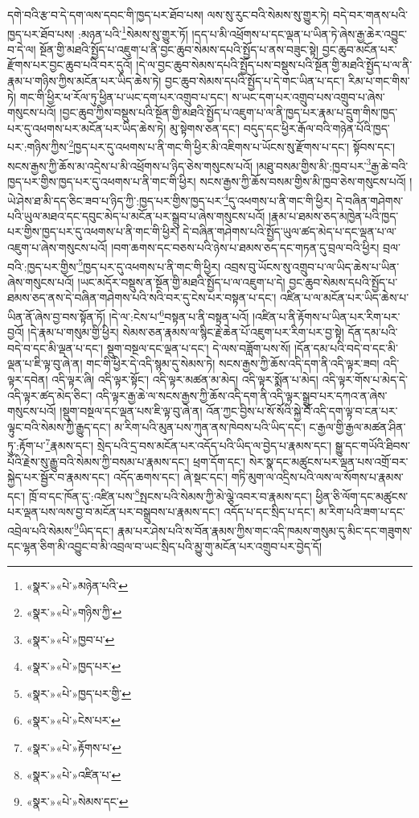 དགེ་བའི་རྩ་བ་དེ་དག་ལས་དབང་གི་ཁྱད་པར་ཐོབ་པས། ལས་སུ་རུང་བའི་སེམས་སུ་གྱུར་ཏེ། བདེ་བར་གནས་པའི་ཁྱད་པར་ཐོབ་པས། :མཉན་པའི་\footnote{«སྣར་»«པེ་»མཉེན་པའི་}སེམས་སུ་གྱུར་ཏོ། །དད་པ་མི་འཕྲོགས་པ་དང་ལྡན་པ་ཡིན་ཏེ་ཞེས་རྒྱ་ཆེར་འབྱུང་བ་དེ་ལ། སྔོན་གྱི་མཐའི་སྤྱོད་པ་འཇུག་པ་ནི་བྱང་ཆུབ་སེམས་དཔའི་སྤྱོད་པ་ནས་བཟུང་སྟེ། བྱང་ཆུབ་མངོན་པར་རྫོགས་པར་བྱང་ཆུབ་པའི་བར་དུའོ། །དེ་ལ་བྱང་ཆུབ་སེམས་དཔའི་སྤྱོད་པས་བསྡུས་པའི་སྔོན་གྱི་མཐའི་སྤྱོད་པ་ལ་ནི་རྣམ་པ་གཉིས་ཀྱིས་མངོན་པར་ཡིད་ཆེས་ཏེ། བྱང་ཆུབ་སེམས་དཔའི་སྤྱོད་པ་དེ་གང་ཡིན་པ་དང་། རིམ་པ་གང་གིས་ཏེ། གང་གི་ཕྱིར་ཕ་རོལ་ཏུ་ཕྱིན་པ་ཡང་དག་པར་འགྲུབ་པ་དང་། ས་ཡང་དག་པར་འགྲུབ་པས་འགྲུབ་པ་ཞེས་གསུངས་པའོ། །བྱང་ཆུབ་ཀྱིས་བསྡུས་པའི་སྔོན་གྱི་མཐའི་སྤྱོད་པ་འཇུག་པ་ལ་ནི་ཁྱད་པར་རྣམ་པ་དྲུག་གིས་ཁྱད་པར་དུ་འཕགས་པར་མངོན་པར་ཡིད་ཆེས་ཏེ། མུ་སྟེགས་ཅན་དང་། བདུད་དང་ཕྱིར་རྒོལ་བའི་གཉེན་པོའི་ཁྱད་པར་:གཉིས་ཀྱིས་\footnote{«སྣར་»«པེ་»གཉིས་ཀྱི་}ཁྱད་པར་དུ་འཕགས་པ་ནི་གང་གི་ཕྱིར་མི་འཇིགས་པ་ཡོངས་སུ་རྫོགས་པ་དང་། སྟོབས་དང་། སངས་རྒྱས་ཀྱི་ཆོས་མ་འདྲེས་པ་མི་འཕྲོགས་པ་ཉིད་ཅེས་གསུངས་པའོ། །མཐུ་བསམ་གྱིས་མི་:ཁྱབ་པར་\footnote{«སྣར་»«པེ་»ཁྱབ་པ་}རྒྱ་ཆེ་བའི་ཁྱད་པར་གྱིས་ཁྱད་པར་དུ་འཕགས་པ་ནི་གང་གི་ཕྱིར། སངས་རྒྱས་ཀྱི་ཆོས་བསམ་གྱིས་མི་ཁྱབ་ཅེས་གསུངས་པའོ། །ཡེ་ཤེས་ཐ་མི་དད་ཅིང་ཟབ་པ་ཉིད་ཀྱི་:ཁྱད་པར་གྱིས་ཁྱད་པར་\footnote{«སྣར་»«པེ་»ཁྱད་པར་}དུ་འཕགས་པ་ནི་གང་གི་ཕྱིར། དེ་བཞིན་གཤེགས་པའི་ཡུལ་མཐའ་དང་དབུང་མེད་པ་མངོན་པར་སྒྲུབ་པ་ཞེས་གསུངས་པའོ། །རྣམ་པ་ཐམས་ཅད་མཁྱེན་པའི་ཁྱད་པར་གྱིས་ཁྱད་པར་དུ་འཕགས་པ་ནི་གང་གི་ཕྱིར། དེ་བཞིན་གཤེགས་པའི་སྤྱོད་ཡུལ་ཚད་མེད་པ་དང་ལྡན་པ་ལ་འཇུག་པ་ཞེས་གསུངས་པའོ། །བག་ཆགས་དང་བཅས་པའི་ཉེས་པ་ཐམས་ཅད་དང་གཏན་དུ་བྲལ་བའི་ཕྱིར། བྲལ་བའི་:ཁྱད་པར་གྱིས་\footnote{«སྣར་»«པེ་»ཁྱད་པར་གྱི་}ཁྱད་པར་དུ་འཕགས་པ་ནི་གང་གི་ཕྱིར། འབྲས་བུ་ཡོངས་སུ་འགྲུབ་པ་ལ་ཡིད་ཆེས་པ་ཡིན་ཞེས་གསུངས་པའོ། །ཡང་མདོར་བསྡུས་ན་སྔོན་གྱི་མཐའི་སྤྱོད་པ་ལ་འཇུག་པ་དེ། བྱང་ཆུབ་སེམས་དཔའི་སྤྱོད་པ་ཐམས་ཅད་ནས་དེ་བཞིན་གཤེགས་པའི་སའི་བར་དུ་ངེས་པར་བསྟན་པ་དང་། འཛིན་པ་ལ་མངོན་པར་ཡིད་ཆེས་པ་ཡིན་ནོ་ཞེས་བྱ་བས་སྟོན་ཏོ། །དེ་ལ་:ངེས་པ་\footnote{«སྣར་»«པེ་»ངེས་པར་}བསྟན་པ་ནི་བསྟན་པའོ། །འཛིན་པ་ནི་རྟོགས་པ་ཡིན་པར་རིག་པར་བྱའོ། །དེ་རྣམ་པ་གསུམ་གྱི་ཕྱིར། སེམས་ཅན་རྣམས་ལ་སྙིང་རྗེ་ཆེན་པོ་འཇུག་པར་རིག་པར་བྱ་སྟེ། དོན་དམ་པའི་བདེ་བ་དང་མི་ལྡན་པ་དང་། སྡུག་བསྔལ་དང་ལྡན་པ་དང་། དེ་ལས་བཟློག་པས་སོ། །དོན་དམ་པའི་བདེ་བ་དང་མི་ལྡན་པ་ཇི་ལྟ་བུ་ཞེ་ན། གང་གི་ཕྱིར་དེ་འདི་སྙམ་དུ་སེམས་ཏེ། སངས་རྒྱས་ཀྱི་ཆོས་འདི་དག་ནི་འདི་ལྟར་ཟབ། འདི་ལྟར་དབེན། འདི་ལྟར་ཞི། འདི་ལྟར་སྟོང་། འདི་ལྟར་མཚན་མ་མེད། འདི་ལྟར་སྨོན་པ་མེད། འདི་ལྟར་གོས་པ་མེད་དེ་འདི་ལྟར་ཚད་མེད་ཅིང་། འདི་ལྟར་རྒྱ་ཆེ་ལ་སངས་རྒྱས་ཀྱི་ཆོས་འདི་དག་ནི་འདི་ལྟར་སྒྲུབ་པར་དཀའ་ན་ཞེས་གསུངས་པའོ། །སྡུག་བསྔལ་དང་ལྡན་པས་ཇི་ལྟ་བུ་ཞེ་ན། འོན་ཀྱང་བྱིས་པ་སོ་སོའི་སྐྱེ་བོ་འདི་དག་ལྟ་བ་ངན་པར་ལྟུང་བའི་སེམས་ཀྱི་རྒྱུད་དང་། མ་རིག་པའི་མུན་པས་ཀུན་ནས་ཁེབས་པའི་ཡིད་དང་། ང་རྒྱལ་གྱི་རྒྱལ་མཚན་ཤིན་ཏུ་:རྟོག་པ་\footnote{«སྣར་»«པེ་»རྟོགས་པ་}རྣམས་དང་། སྲེད་པའི་དྲ་བས་མངོན་པར་འདོད་པའི་ཡིད་ལ་བྱེད་པ་རྣམས་དང་། སྒྱུ་དང་གཡོའི་ཐིབས་པོའི་རྗེས་སུ་རྒྱུ་བའི་སེམས་ཀྱི་བསམ་པ་རྣམས་དང་། ཕྲག་དོག་དང་། སེར་སྣ་དང་མཚུངས་པར་ལྡན་པས་འགྲོ་བར་སྐྱེད་པར་སྦྱོར་བ་རྣམས་དང་། འདོད་ཆགས་དང་། ཞེ་སྡང་དང་། གཏི་མུག་ལ་འདྲིས་པའི་ལས་ལ་སོགས་པ་རྣམས་དང་། ཁྲོ་བ་དང་ཁོན་དུ་:འཛིན་པས་\footnote{«སྣར་»«པེ་»འཛིན་པ་}སྤངས་པའི་སེམས་ཀྱི་མེ་ལྕེ་འབར་བ་རྣམས་དང་། ཕྱིན་ཅི་ལོག་དང་མཚུངས་པར་ལྡན་པས་ལས་བྱ་བ་མངོན་པར་བསྒྲུབས་པ་རྣམས་དང་། འདོད་པ་དང་སྲིད་པ་དང་། མ་རིག་པའི་ཟག་པ་དང་འབྲེལ་པའི་སེམས་\footnote{«སྣར་»«པེ་»སེམས་དང་}ཡིད་དང་། རྣམ་པར་ཤེས་པའི་ས་བོན་རྣམས་ཀྱིས་གང་འདི་ཁམས་གསུམ་དུ་མིང་དང་གཟུགས་དང་ལྷན་ཅིག་མི་འབྱུང་བ་མི་འབྲལ་བ་ཡང་སྲིད་པའི་མྱུ་གུ་མངོན་པར་འགྲུབ་པར་བྱེད་དོ། 